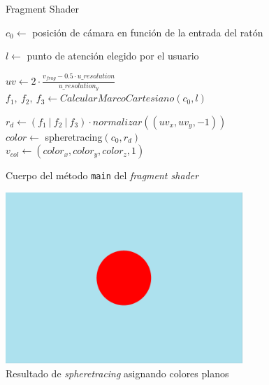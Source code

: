 \begin{figure}[ht!]
    \centering
    
       \begin{algorithm}[H]
            \caption{Fragment Shader}

                $c_0 \gets $ posición de cámara en función de la entrada del ratón

                $l\gets $ punto de atención elegido por el usuario
                
                $uv \gets 2\cdot \frac{v_{frag} - 0.5\cdot u\_resolution}{u\_resolution_y}$\\[5pt]

                $f_1,\ f_2,\ f_3 \gets CalcularMarcoCartesiano(c_0, l)$
                
                $r_d \gets (f_1\ \vert \ f_2\ \vert \ f_3)\cdot normalizar ((uv_x, uv_y,-1))$\\[5pt]

                $color \gets$ spheretracing$(c_0, r_d)$\\[5pt]

                $v_{col} \gets (color_x, color_y, color_z, 1)$
        \end{algorithm}
    \caption{Cuerpo del método \texttt{main} del \textit{fragment shader}}
    \label{fig:mainFS}
\end{figure}


\begin{figure}[ht!]
    \centering
    \includegraphics[width=0.8\textwidth]{Plantilla-TFG-master/img/escenaPlana.png}
    \caption{Resultado de \textit{spheretracing} asignando colores planos}
    \label{fig:planos}
\end{figure}
